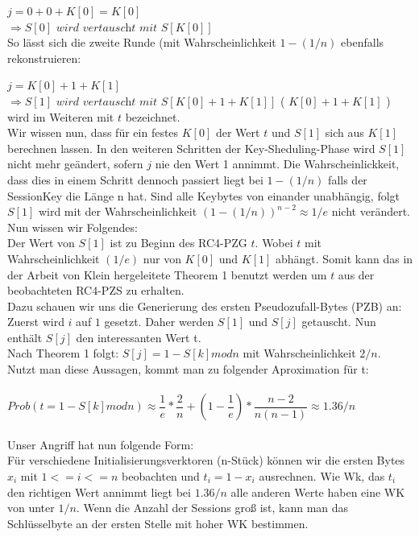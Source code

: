 \documentclass[10pt,a4paper]{article}
\begin{document}
$ j = 0+0+K[0] = K[0] $\\
$\Rightarrow S[0] \textit{ wird vertauscht mit }  S[K[0]] $\\

So lässt sich die zweite Runde (mit Wahrscheinlichkeit $1 - (1/n)$ ebenfalls rekonstruieren:

$ j = K[0] + 1 + K[1]$\\  
$\Rightarrow S[1] \textit{ wird vertauscht mit } S[ K[0] + 1 + K[1] ] $ ( $K[0] + 1 + K[1]$ ) wird im Weiteren mit  $t$ bezeichnet.\\

Wir wissen nun, dass für ein festes $K[0]$ der Wert $t$ und $S[1]$ sich aus $K[1]$ berechnen lassen.
In den weiteren Schritten der Key-Sheduling-Phase wird $S[1]$ nicht mehr geändert, sofern $j$ nie den Wert 1 annimmt.
Die Wahrscheinlickkeit, dass dies in einem Schritt dennoch passiert liegt bei $1 - (1/n)$ falls der SessionKey die Länge n hat.
Sind alle Keybytes von einander unabhängig, folgt $S[1]$ wird mit der Wahrscheinlichkeit $(1-(1/n))^{n-2} \approx 1/e$ nicht verändert.\\
Nun wissen wir Folgendes:\\
Der Wert von $S[1]$ ist zu Beginn des RC4-PZG $t$. Wobei $t$ mit Wahrscheinlichkeit $(1/e)$ nur von $K[0]$ und $K[1]$ abhängt. Somit kann das in der Arbeit von Klein hergeleitete Theorem 1 \cite{Kle08} benutzt werden um $t$ aus der beobachteten RC4-PZS zu erhalten.\\
Dazu schauen wir uns die Generierung des ersten Pseudozufall-Bytes (PZB) an:\\
Zuerst wird $i$ auf $1$ gesetzt. Daher werden $S[1]$ und $S[j]$ getauscht. Nun enthält $S[j]$ den interessanten Wert t.\\
Nach Theorem 1 folgt: $S[j] = 1 - S[k] mod n$ mit Wahrscheinlichkeit $2/n$.\\
Nutzt man diese Aussagen, kommt man zu folgender Aproximation für t:\\\\
$Prob( t = 1 - S[k] mod n) \approx \dfrac{1}{e} * \dfrac{2}{n} + ( 1- \dfrac{1}{e}) * \dfrac{n-2}{n(n-1)} \approx 1.36/n$\\\\
Unser Angriff hat nun folgende Form:\\
Für verschiedene Initialisierungsverktoren (n-Stück) können wir die ersten Bytes $x_i$ mit $1 <= i <= n$ beobachten und $t_i = 1 - x_i$ ausrechnen. Wie Wk, das $t_i$ den richtigen Wert annimmt liegt bei $1.36/n$ alle anderen Werte haben eine WK von unter $1/n$. Wenn die Anzahl der Sessions groß ist, kann man das Schlüsselbyte an der ersten Stelle mit hoher WK bestimmen.\\
\end{document}
